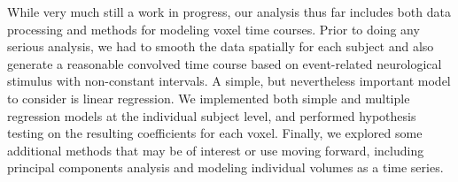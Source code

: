 \par \indent While very much still a work in progress, our analysis thus far includes both data processing and methods for modeling voxel time courses. Prior to doing any serious analysis, we had to smooth the data spatially for each subject and also generate a reasonable convolved time course based on event-related neurological stimulus with non-constant intervals. A simple, but nevertheless important model to consider is linear regression. We implemented both simple and multiple regression models at the individual subject level, and performed hypothesis testing on the resulting coefficients for each voxel. Finally, we explored some additional methods that may be of interest or use moving forward, including principal components analysis and modeling individual volumes as a time series. 
